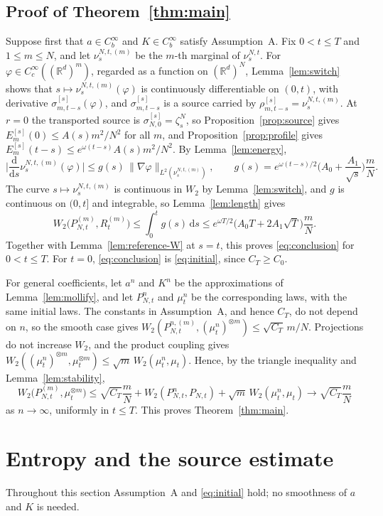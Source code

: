 \documentclass[11pt]{amsart}
\numberwithin{equation}{section}
\theoremstyle{plain}
\theoremstyle{remark}
\newcommand{\R}{\mathbb{R}}
\newcommand{\W}{W_2}
\newcommand{\dd}{\mathrm{d}}
\begin{document}
\subsection{Proof of Theorem~\ref{thm:main}}\label{sec:proof-main}
Suppose first that $a\in C^\infty_b$ and $K\in C^\infty_b$ satisfy Assumption~A. Fix $0<t\le T$ and $1\le m\le N$, and let $\nu^{N,t,(m)}_s$ be the $m$-th marginal of $\nu^{N,t}_s$. For $\varphi\in C^\infty_c((\R^d)^m)$, regarded as a function on $(\R^d)^N$, Lemma~\ref{lem:switch} shows that $s\mapsto\nu^{N,t,(m)}_s(\varphi)$ is continuously differentiable on $(0,t)$, with derivative $\sigma^{[s]}_{m,t-s}(\varphi)$, and $\sigma^{[s]}_{m,t-s}$ is a source carried by $\rho^{[s]}_{m,t-s}=\nu^{N,t,(m)}_s$. At $r=0$ the transported source is $\sigma^{[s]}_{N,0}=\zeta^N_s$, so Proposition~\ref{prop:source} gives $E^{[s]}_m(0)\le A(s)m^2/N^2$ for all $m$, and Proposition~\ref{prop:profile} gives $E^{[s]}_m(t-s)\le e^{\omega(t-s)}A(s)m^2/N^2$. By Lemma~\ref{lem:energy},
\[
\Big|\frac{\dd}{\dd s}\nu^{N,t,(m)}_s(\varphi)\Big|\le g(s)\,\|\nabla\varphi\|_{L^2(\nu^{N,t,(m)}_s)},\qquad g(s)=e^{\omega(t-s)/2}\Big(A_0+\frac{A_1}{\sqrt s}\Big)\frac mN.
\]
The curve $s\mapsto\nu^{N,t,(m)}_s$ is continuous in $\W$ by Lemma~\ref{lem:switch}, and $g$ is continuous on $(0,t]$ and integrable, so Lemma~\ref{lem:length} gives
\[
\W\big(P^{(m)}_{N,t},R^{(m)}_t\big)\le\int_0^tg(s)\,\dd s\le e^{\omega T/2}\big(A_0T+2A_1\sqrt T\big)\frac mN.
\]
Together with Lemma~\ref{lem:reference-W} at $s=t$, this proves \eqref{eq:conclusion} for $0<t\le T$. For $t=0$, \eqref{eq:conclusion} is \eqref{eq:initial}, since $C_T\ge C_0$.

For general coefficients, let $a^n$ and $K^n$ be the approximations of Lemma~\ref{lem:mollify}, and let $P^n_{N,t}$ and $\mu^n_t$ be the corresponding laws, with the same initial laws. The constants in Assumption~A, and hence $C_T$, do not depend on $n$, so the smooth case gives $\W(P^{n,(m)}_{N,t},(\mu^n_t)^{\otimes m})\le\sqrt{C_T}\,m/N$. Projections do not increase $\W$, and the product coupling gives $\W((\mu^n_t)^{\otimes m},\mu_t^{\otimes m})\le\sqrt m\,\W(\mu^n_t,\mu_t)$. Hence, by the triangle inequality and Lemma~\ref{lem:stability},
\[
\W\big(P^{(m)}_{N,t},\mu_t^{\otimes m}\big)\le\sqrt{C_T}\frac mN+\W(P^n_{N,t},P_{N,t})+\sqrt m\,\W(\mu^n_t,\mu_t)\longrightarrow\sqrt{C_T}\frac mN
\]
as $n\to\infty$, uniformly in $t\le T$. This proves Theorem~\ref{thm:main}.

\section{Entropy and the source estimate}\label{sec:source}
Throughout this section Assumption~A and \eqref{eq:initial} hold; no smoothness of $a$ and $K$ is needed.
\end{document}
